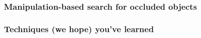 \begin{frame}
\frametitle{Manipulation-based search for occluded objects}
\end{frame}

\begin{frame}
  \frametitle{Techniques (we hope) you've learned}
\end{frame}

